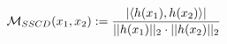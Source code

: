 \documentclass[preview]{standalone}
\begin{document}
\begin{align*}
\special{dvisvgm:raw <g id='unique000'>}\mathcal{M}_{SSCD}(x_1, x_2) := \frac{|\langle h(x_1), h(x_2) \rangle|}{||h(x_1)||_2 \cdot ||h(x_2)||_2}\special{dvisvgm:raw </g>}
\end{align*}
\end{document}

